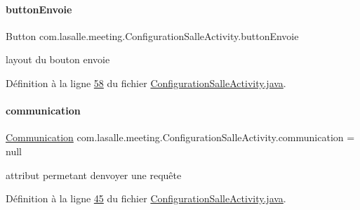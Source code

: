 \paragraph{\texorpdfstring{button\+Envoie}{buttonEnvoie}}
{\footnotesize\ttfamily Button com.\+lasalle.\+meeting.\+Configuration\+Salle\+Activity.\+button\+Envoie\hspace{0.3cm}{\ttfamily [private]}}



layout du bouton envoie 



Définition à la ligne \hyperlink{_configuration_salle_activity_8java_source_l00058}{58} du fichier \hyperlink{_configuration_salle_activity_8java_source}{Configuration\+Salle\+Activity.\+java}.

\mbox{\label{classcom_1_1lasalle_1_1meeting_1_1_configuration_salle_activity_a8ad9ee754954c8bc7d9c3f8313e48a2c}} 
\paragraph{\texorpdfstring{communication}{communication}}
{\footnotesize\ttfamily \hyperlink{classcom_1_1lasalle_1_1meeting_1_1_communication}{Communication} com.\+lasalle.\+meeting.\+Configuration\+Salle\+Activity.\+communication = null\hspace{0.3cm}{\ttfamily [private]}}



attribut permetant d\textquotesingle{}envoyer une requête 



Définition à la ligne \hyperlink{_configuration_salle_activity_8java_source_l00045}{45} du fichier \hyperlink{_configuration_salle_activity_8java_source}{Configuration\+Salle\+Activity.\+java}.

\mbox{\label{classcom_1_1lasalle_1_1meeting_1_1_configuration_salle_activity_a2cdfb9a7b34f5d63e346a535411337cc}} 
